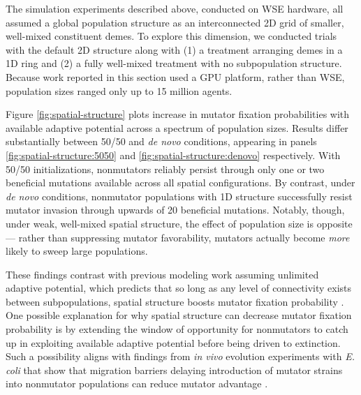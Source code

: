 The simulation experiments described above, conducted on WSE hardware, all assumed a global population structure as an interconnected 2D grid of smaller, well-mixed constituent demes.
To explore this dimension, we conducted trials with the default 2D structure along with (1) a treatment arranging demes in a 1D ring and (2) a fully well-mixed treatment with no subpopulation structure.
Because work reported in this section used a GPU platform, rather than WSE, population sizes ranged only up to 15 million agents.



Figure \ref{fig:spatial-structure} plots increase in mutator fixation probabilities with available adaptive potential across a spectrum of population sizes.
Results differ substantially between 50/50 and \textit{de novo} conditions, appearing in panels \ref{fig:spatial-structure:5050} and \ref{fig:spatial-structure:denovo} respectively.
With 50/50 initializations, nonmutators reliably persist through only one or two beneficial mutations available across all spatial configurations.
By contrast, under \textit{de novo} conditions, nonmutator populations with 1D structure successfully resist mutator invasion through upwards of 20 beneficial mutations.
Notably, though, under weak, well-mixed spatial structure, the effect of population size is opposite --- rather than suppressing mutator favorability, mutators actually become \textit{more} likely to sweep large populations.

These findings contrast with previous modeling work assuming unlimited adaptive potential, which predicts that so long as any level of connectivity exists between subpopulations, spatial structure boosts mutator fixation probability \citep{raynes2019migration}.
One possible explanation for why spatial structure can decrease mutator fixation probability is by extending the window of opportunity for nonmutators to catch up in exploiting available adaptive potential before being driven to extinction.
Such a possibility aligns with findings from \textit{in vivo} evolution experiments with \textit{E. coli} that show that migration barriers delaying introduction of mutator strains into nonmutator populations can reduce mutator advantage \citep{lechat2006escherichia}.
